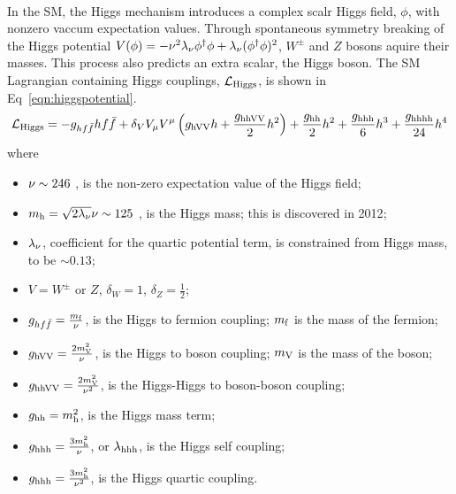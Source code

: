 \paragraph{}
In the SM, the Higgs mechanism introduces a complex scalr Higgs field, $\phi$, with nonzero vaccum expectation values. Through spontaneous symmetry breaking of the Higgs potential $V(\phi) = -\nu^2\lambda_{\rm \nu} \phi^{\dagger}\phi + \lambda_{\rm \nu}(\phi^\dagger\phi)^2$, $W^{\pm}$ and $Z$ bosons aquire their masses. This process also predicts an extra scalar, the Higgs boson. The SM Lagrangian containing Higgs couplings, $\mathcal{L}_{\rm Higgs}$, is shown in Eq~\ref{eqn:higgspotential}.
\begin{equation}
\label{eqn:higgspotential}
\mathcal{L}_{\rm Higgs} = -g_{hf\bar{f}} hf\bar{f} + \delta_{V} V_{\rm\mu} V^{\rm\mu}\left(g_{\rm hVV} h + \frac{g_{\rm hhVV}}{2}h^2\right) + \frac{g_{\rm hh}}{2}h^2 + \frac{g_{\rm hhh}}{6}h^3 + \frac{g_{\rm hhhh}}{24}h^4 
\end{equation}
where 
\begin{itemize}
	\item $\rm\nu \sim 246$ \GeV, is the non-zero expectation value of the Higgs field;\
	\item $m_{\rm h} = \sqrt{2\lambda_{\rm \nu}}\nu \sim 125$ \GeV, is the Higgs mass; this is discovered in 2012\cite{ATLASHiggsDisc, CMSHiggsDisc}; 
	\item $\lambda_{\rm \nu}$, coefficient for the quartic potential term, is constrained from Higgs mass, to be $\sim 0.13$;
	\item $V = W^{\pm}$ or $Z$, $\delta_{W} = 1$, $\delta_{Z} = \frac{1}{2}$;
	\item $g_{hf\bar{f}} = \frac{m_{\rm f}}{\rm\nu}$, is the Higgs to fermion coupling; $m_{\rm f}$ is the mass of the fermion;
	\item $g_{\rm hVV} = \frac{2m_{\rm V}^2}{\rm\nu}$, is the Higgs to boson coupling; $m_{\rm V}$ is the mass of the boson;
	\item $g_{\rm hhVV} = \frac{2m_{\rm V}^2}{\rm\nu^2}$, is the Higgs-Higgs to boson-boson coupling;
	\item $g_{\rm hh} = m_{\rm h}^2$, is the Higgs mass term;
	\item $g_{\rm hhh} = \frac{3m_{\rm h}^2}{\rm\nu}$, or $\lambda_{\rm hhh}$, is the Higgs self coupling;
	\item $g_{\rm hhh} = \frac{3m_{\rm h}^2}{\rm\rm\nu^2}$, is the Higgs quartic coupling.
\end{itemize}
